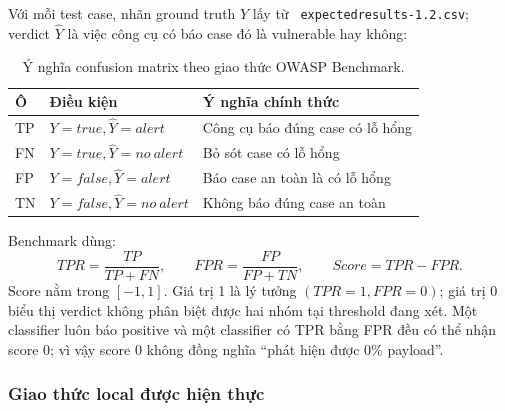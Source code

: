 \documentclass[runningheads]{report-template/llncs}
\newcommand{\code}[1]{\texttt{\small\hyphenchar\font=45 #1}}
\begin{document}
Với mỗi test case, nhãn ground truth \(Y\) lấy từ
\code{expectedresults-1.2.csv}; verdict \(\hat{Y}\) là việc công cụ có
báo case đó là vulnerable hay không:

\begin{table}
\caption{Ý nghĩa confusion matrix theo giao thức OWASP Benchmark.}
\label{tab:benchmark-confusion}
\centering\small
\begin{tabularx}{\textwidth}{@{}p{24mm}p{44mm}Y@{}}
\toprule
Ô & Điều kiện & Ý nghĩa chính thức\\
\midrule
TP & \(Y=true,\hat{Y}=alert\) & Công cụ báo đúng case có lỗ hổng\\
FN & \(Y=true,\hat{Y}=no\ alert\) & Bỏ sót case có lỗ hổng\\
FP & \(Y=false,\hat{Y}=alert\) & Báo case an toàn là có lỗ hổng\\
TN & \(Y=false,\hat{Y}=no\ alert\) & Không báo đúng case an toàn\\
\bottomrule
\end{tabularx}
\end{table}

Benchmark dùng:
\[
TPR=\frac{TP}{TP+FN},\qquad
FPR=\frac{FP}{FP+TN},\qquad
Score=TPR-FPR.
\]
Score nằm trong \([-1,1]\). Giá trị 1 là lý tưởng
\((TPR=1,FPR=0)\); giá trị 0 biểu thị verdict không phân biệt được hai
nhóm tại threshold đang xét. Một classifier luôn báo positive và một
classifier có TPR bằng FPR đều có thể nhận score 0; vì vậy score 0 không
đồng nghĩa ``phát hiện được 0\% payload''.

\subsubsection{Giao thức local được hiện thực}
\end{document}
